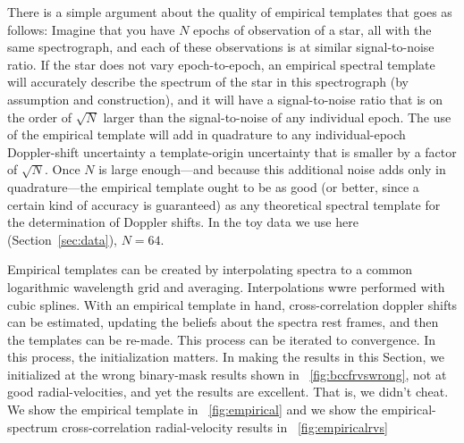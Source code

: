 \documentclass[modern]{aastex631}
\newcommand{\sectionname}{Section}
\newcommand{\secref}[1]{\sectionname~\ref{#1}}
\newcommand{\figref}[1]{\figurename~\ref{#1}}
\begin{document}
There is a simple argument about the quality of empirical templates that goes as follows:
Imagine that you have $N$ epochs of observation of a star, all with the same spectrograph, and each of these observations is at similar signal-to-noise ratio.
If the star does not vary epoch-to-epoch, an empirical spectral template will accurately describe the spectrum of the star in this spectrograph (by assumption and construction), and it will have a signal-to-noise ratio that is on the order of $\sqrt{N}$ larger than the signal-to-noise of any individual epoch.
The use of the empirical template will add in quadrature to any individual-epoch Doppler-shift uncertainty a template-origin uncertainty that is smaller by a factor of $\sqrt{N}$.
Once $N$ is large enough---and because this additional noise adds only in quadrature---the empirical template ought to be as good (or better, since a certain kind of accuracy is guaranteed) as any theoretical spectral template for the determination of Doppler shifts.
In the toy data we use here (\secref{sec:data}), $N=64$.

Empirical templates can be created by interpolating spectra to a common logarithmic wavelength grid and averaging.
Interpolations wwre performed with cubic splines.
With an empirical template in hand, cross-correlation doppler shifts can be estimated, updating the beliefs about the spectra rest frames, and then the templates can be re-made.
This process can be iterated to convergence.
In this process, the initialization matters.
In making the results in this \sectionname, we initialized at the wrong binary-mask results shown in \figref{fig:bccfrvswrong}, not at good radial-velocities, and yet the results are excellent.
That is, we didn't cheat.
We show the empirical template in \figref{fig:empirical} and we show the
empirical-spectrum cross-correlation radial-velocity results in \figref{fig:empiricalrvs}
\end{document}
